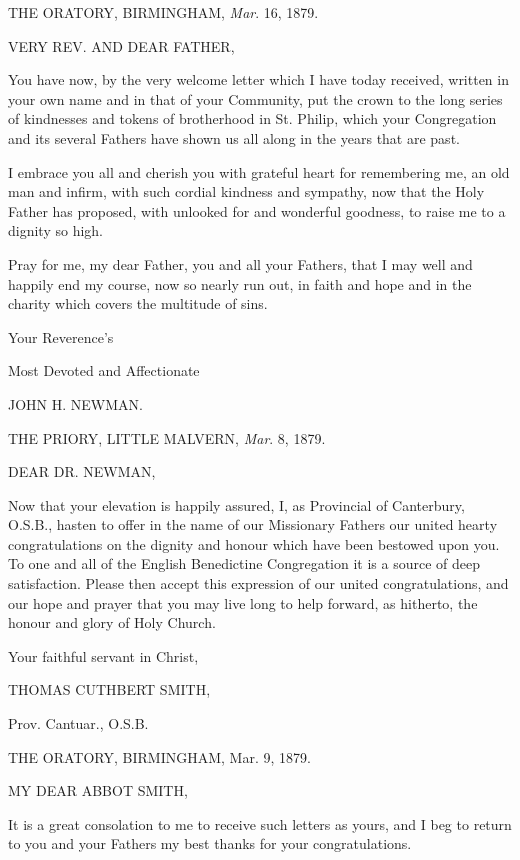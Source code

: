 
THE ORATORY, BIRMINGHAM,
\emph{Mar}. 16, 1879.

VERY REV. AND
DEAR FATHER,

You have now, by the very welcome letter which I have today received,
written in your own name and in that of your Community, put the crown
to the long series of kindnesses and tokens of brotherhood in St.
Philip, which your Congregation and its several Fathers have shown us
all along in the years that are past.

I embrace you all and cherish you with grateful heart for
remembering me, an old man and infirm, with such cordial kindness and
sympathy, now that the Holy Father has proposed, with unlooked for and
wonderful goodness, to raise me to a dignity so high.

Pray for me, my dear Father, you and all your Fathers, that I may
well and happily end my course, now so nearly run out, in faith and
hope and in the charity which covers the multitude of sins.

Your Reverence's

Most Devoted and Affectionate

JOHN H. NEWMAN.


THE PRIORY, LITTLE
MALVERN, \emph{Mar}. 8, 1879.

DEAR DR. NEWMAN,

Now that your elevation is happily assured, I, as Provincial of
Canterbury, O.S.B., hasten to offer in the name of our Missionary
Fathers our united hearty congratulations on the dignity and honour
which have been bestowed upon you. To one and all of the English
Benedictine Congregation it is a source of deep satisfaction. Please
then accept this expression of our united congratulations, and our
hope and prayer that you may live long to help forward, as hitherto,
the honour and glory of Holy Church.

Your faithful servant in Christ,

THOMAS CUTHBERT SMITH,

Prov. Cantuar., O.S.B.


THE ORATORY, BIRMINGHAM,
Mar. 9, 1879.

MY DEAR ABBOT
SMITH,

It is a great consolation to me to receive such letters as yours, and
I beg to return to you and your Fathers my best thanks for your
congratulations.

